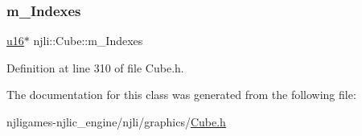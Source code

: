 \subsubsection{\texorpdfstring{m\+\_\+\+Indexes}{m\_Indexes}}
{\footnotesize\ttfamily \mbox{\hyperlink{_util_8h_a9e6c91d77e24643b888dbd1a1a590054}{u16}}$\ast$ njli\+::\+Cube\+::m\+\_\+\+Indexes\hspace{0.3cm}{\ttfamily [private]}}



Definition at line 310 of file Cube.\+h.



The documentation for this class was generated from the following file\+:\begin{DoxyCompactItemize}
\item 
njligames-\/njlic\+\_\+engine/njli/graphics/\mbox{\hyperlink{_cube_8h}{Cube.\+h}}\end{DoxyCompactItemize}
